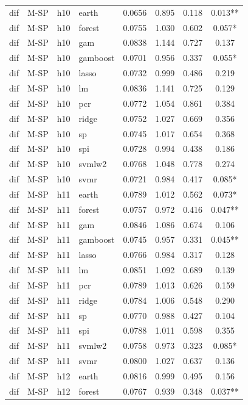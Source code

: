 \begin{ThreePartTable}
\begin{longtable}[t]{llclcccc}
\addlinespace
dif & M-SP & h10 & earth & 0.0656 & 0.895 & 0.118 & 0.013**\\
dif & M-SP & h10 & forest & 0.0755 & 1.030 & 0.602 & 0.057*\\
dif & M-SP & h10 & gam & 0.0838 & 1.144 & 0.727 & 0.137\\
dif & M-SP & h10 & gamboost & 0.0701 & 0.956 & 0.337 & 0.055*\\
dif & M-SP & h10 & lasso & 0.0732 & 0.999 & 0.486 & 0.219\\
dif & M-SP & h10 & lm & 0.0836 & 1.141 & 0.725 & 0.129\\
dif & M-SP & h10 & pcr & 0.0772 & 1.054 & 0.861 & 0.384\\
dif & M-SP & h10 & ridge & 0.0752 & 1.027 & 0.669 & 0.356\\
dif & M-SP & h10 & sp & 0.0745 & 1.017 & 0.654 & 0.368\\
dif & M-SP & h10 & spi & 0.0728 & 0.994 & 0.438 & 0.186\\
dif & M-SP & h10 & svmlw2 & 0.0768 & 1.048 & 0.778 & 0.274\\
dif & M-SP & h10 & svmr & 0.0721 & 0.984 & 0.417 & 0.085*\\
\addlinespace
dif & M-SP & h11 & earth & 0.0789 & 1.012 & 0.562 & 0.073*\\
dif & M-SP & h11 & forest & 0.0757 & 0.972 & 0.416 & 0.047**\\
dif & M-SP & h11 & gam & 0.0846 & 1.086 & 0.674 & 0.106\\
dif & M-SP & h11 & gamboost & 0.0745 & 0.957 & 0.331 & 0.045**\\
dif & M-SP & h11 & lasso & 0.0766 & 0.984 & 0.317 & 0.128\\
dif & M-SP & h11 & lm & 0.0851 & 1.092 & 0.689 & 0.139\\
dif & M-SP & h11 & pcr & 0.0789 & 1.013 & 0.626 & 0.159\\
dif & M-SP & h11 & ridge & 0.0784 & 1.006 & 0.548 & 0.290\\
dif & M-SP & h11 & sp & 0.0770 & 0.988 & 0.427 & 0.104\\
dif & M-SP & h11 & spi & 0.0788 & 1.011 & 0.598 & 0.355\\
dif & M-SP & h11 & svmlw2 & 0.0758 & 0.973 & 0.323 & 0.085*\\
dif & M-SP & h11 & svmr & 0.0800 & 1.027 & 0.637 & 0.136\\
\addlinespace
dif & M-SP & h12 & earth & 0.0816 & 0.999 & 0.495 & 0.156\\
dif & M-SP & h12 & forest & 0.0767 & 0.939 & 0.348 & 0.037**\\

\end{longtable}
\end{ThreePartTable}
